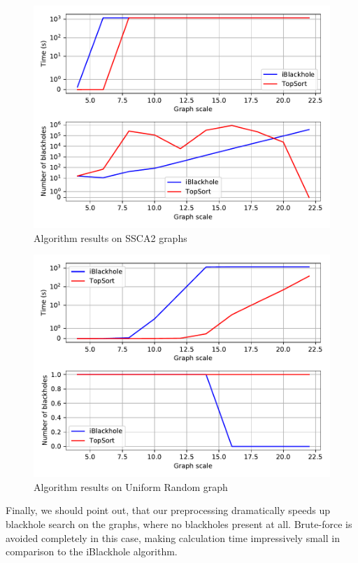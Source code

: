 \documentclass{svproc}
\begin{document}
\begin{figure}[H]
	\includegraphics[width=\linewidth]{ssca2.pdf}
	\caption{Algorithm results on SSCA2 graphs}
	\label{fig:ssca2}
\end{figure}
\begin{figure}[H]
	\includegraphics[width=\linewidth]{ur.pdf}
	\caption{Algorithm results on Uniform Random graph}
	\label{fig:ur}
\end{figure}

Finally, we should point out, that our preprocessing dramatically speeds up blackhole search on the graphs, where no blackholes present at all. Brute-force is
avoided completely in this case, making calculation time impressively small in comparison to the iBlackhole algorithm.
\end{document}
